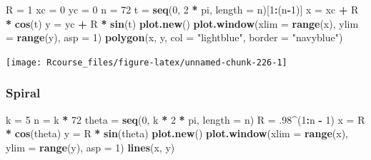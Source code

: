 \documentclass[]{book}
\newenvironment{Shaded}{\begin{snugshade}}{\end{snugshade}}
\newcommand{\KeywordTok}[1]{\textcolor[rgb]{0.13,0.29,0.53}{\textbf{#1}}}
\newcommand{\DataTypeTok}[1]{\textcolor[rgb]{0.13,0.29,0.53}{#1}}
\newcommand{\DecValTok}[1]{\textcolor[rgb]{0.00,0.00,0.81}{#1}}
\newcommand{\StringTok}[1]{\textcolor[rgb]{0.31,0.60,0.02}{#1}}
\newcommand{\OperatorTok}[1]{\textcolor[rgb]{0.81,0.36,0.00}{\textbf{#1}}}
\newcommand{\NormalTok}[1]{#1}
\theoremstyle{definition}
\theoremstyle{definition}
\theoremstyle{definition}
\theoremstyle{remark}
\begin{document}
\begin{Shaded}
\begin{Highlighting}[]
\NormalTok{R =}\StringTok{ }\DecValTok{1}
\NormalTok{xc =}\StringTok{ }\DecValTok{0}
\NormalTok{yc =}\StringTok{ }\DecValTok{0}
\NormalTok{n =}\StringTok{ }\DecValTok{72}
\NormalTok{t =}\StringTok{ }\KeywordTok{seq}\NormalTok{(}\DecValTok{0}\NormalTok{, }\DecValTok{2} \OperatorTok{*}\StringTok{ }\NormalTok{pi, }\DataTypeTok{length =}\NormalTok{ n)[}\DecValTok{1}\OperatorTok{:}\NormalTok{(n}\OperatorTok{-}\DecValTok{1}\NormalTok{)]}
\NormalTok{x =}\StringTok{ }\NormalTok{xc }\OperatorTok{+}\StringTok{ }\NormalTok{R }\OperatorTok{*}\StringTok{ }\KeywordTok{cos}\NormalTok{(t)}
\NormalTok{y =}\StringTok{ }\NormalTok{yc }\OperatorTok{+}\StringTok{ }\NormalTok{R }\OperatorTok{*}\StringTok{ }\KeywordTok{sin}\NormalTok{(t)}
\KeywordTok{plot.new}\NormalTok{()}
\KeywordTok{plot.window}\NormalTok{(}\DataTypeTok{xlim =} \KeywordTok{range}\NormalTok{(x), }\DataTypeTok{ylim =} \KeywordTok{range}\NormalTok{(y), }\DataTypeTok{asp =} \DecValTok{1}\NormalTok{)}
\KeywordTok{polygon}\NormalTok{(x, y, }\DataTypeTok{col =} \StringTok{"lightblue"}\NormalTok{, }\DataTypeTok{border =} \StringTok{"navyblue"}\NormalTok{)}
\end{Highlighting}
\end{Shaded}

\texttt{[image: Rcourse\_files/figure-latex/unnamed-chunk-226-1]}

\subsubsection{Spiral}\label{spiral}

\begin{Shaded}
\begin{Highlighting}[]
\NormalTok{k =}\StringTok{ }\DecValTok{5}
\NormalTok{n =}\StringTok{ }\NormalTok{k }\OperatorTok{*}\StringTok{ }\DecValTok{72}
\NormalTok{theta =}\StringTok{ }\KeywordTok{seq}\NormalTok{(}\DecValTok{0}\NormalTok{, k }\OperatorTok{*}\StringTok{ }\DecValTok{2} \OperatorTok{*}\StringTok{ }\NormalTok{pi, }\DataTypeTok{length =}\NormalTok{ n)}
\NormalTok{R =}\StringTok{ }\NormalTok{.}\DecValTok{98}\OperatorTok{^}\NormalTok{(}\DecValTok{1}\OperatorTok{:}\NormalTok{n }\OperatorTok{-}\StringTok{ }\DecValTok{1}\NormalTok{)}
\NormalTok{x =}\StringTok{ }\NormalTok{R }\OperatorTok{*}\StringTok{ }\KeywordTok{cos}\NormalTok{(theta)}
\NormalTok{y =}\StringTok{ }\NormalTok{R }\OperatorTok{*}\StringTok{ }\KeywordTok{sin}\NormalTok{(theta)}
\KeywordTok{plot.new}\NormalTok{()}
\KeywordTok{plot.window}\NormalTok{(}\DataTypeTok{xlim =} \KeywordTok{range}\NormalTok{(x), }\DataTypeTok{ylim =} \KeywordTok{range}\NormalTok{(y), }\DataTypeTok{asp =} \DecValTok{1}\NormalTok{)}
\KeywordTok{lines}\NormalTok{(x, y)}
\end{Highlighting}
\end{Shaded}
\end{document}
